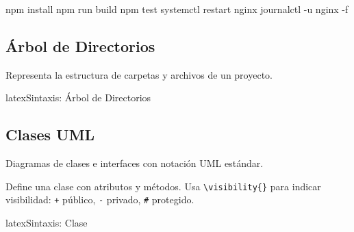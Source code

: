 \begin{terminal}
  \prompt npm install
  \prompt npm run build
  \prompt npm test
  \promptroot systemctl restart nginx
  \promptroot journalctl -u nginx -f
\end{terminal}

\subsection{Árbol de Directorios}
\label{subsec:dirtree}

Representa la estructura de carpetas y archivos de un proyecto.

\begin{codigosimple}{latex}{Sintaxis: Árbol de Directorios}
\begin{dirtreebox}[Título]
\end{dirtreebox}
\end{codigosimple}

\begin{dirtreebox}
\end{dirtreebox}

\subsection{Clases UML}
\label{subsec:uml}

Diagramas de clases e interfaces con notación UML estándar.

Define una clase con atributos y métodos. Usa \verb|\visibility{}| para indicar
visibilidad: \texttt{+} público, \texttt{-} privado, \texttt{\#} protegido.

\begin{codigosimple}{latex}{Sintaxis: Clase}
\end{codigosimple}

